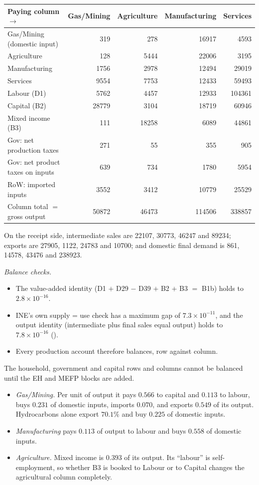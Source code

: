 \documentclass[../solutions_manual.tex]{subfiles}
\begin{document}
\begin{center}\small
\begin{tabular}{lrrrr}
\toprule
Paying column $\to$ & Gas/Mining & Agriculture & Manufacturing & Services \\
\midrule
Gas/Mining (domestic input) & 319 & 278 & 16917 & 4593 \\
Agriculture & 128 & 5444 & 22006 & 3195 \\
Manufacturing & 1756 & 2978 & 12494 & 29019 \\
Services & 9554 & 7753 & 12433 & 59493 \\
Labour (D1) & 5762 & 4457 & 12933 & 104361 \\
Capital (B2) & 28779 & 3104 & 18719 & 60946 \\
Mixed income (B3) & 111 & 18258 & 6089 & 44861 \\
Gov: net production taxes & 271 & 55 & 355 & 905 \\
Gov: net product taxes on inputs & 639 & 734 & 1780 & 5954 \\
RoW: imported inputs & 3552 & 3412 & 10779 & 25529 \\
\midrule
Column total $=$ gross output & 50872 & 46473 & 114506 & 338857 \\
\bottomrule
\end{tabular}
\end{center}
On the receipt side, intermediate sales are 22107, 30773, 46247 and 89234; exports are 27905, 1122, 24783 and 10700; and domestic final demand is 861, 14578, 43476 and 238923.

\emph{Balance checks.}
\begin{itemize}
\item The value-added identity (D1 $+$ D29 $-$ D39 $+$ B2 $+$ B3 $=$ B1b) holds to $2.8\times10^{-16}$.
\item INE's own supply = use check has a maximum gap of $7.3\times10^{-11}$, and the output identity (intermediate plus final sales equal output) holds to $7.8\times10^{-16}$ ().
\item Every production account therefore balances, row against column.
\end{itemize}
The household, government and capital rows and columns cannot be balanced until the EH and MEFP blocks are added.

\begin{itemize}
\item \emph{Gas/Mining.} Per unit of output it pays $0.566$ to capital and $0.113$ to labour, buys $0.231$ of domestic inputs, imports $0.070$, and exports $0.549$ of its output. Hydrocarbons alone export $70.1\%$ and buy $0.225$ of domestic inputs.
\item \emph{Manufacturing} pays $0.113$ of output to labour and buys $0.558$ of domestic inputs.
\item \emph{Agriculture.} Mixed income is $0.393$ of its output. Its ``labour'' is self-employment, so whether B3 is booked to Labour or to Capital changes the agricultural column completely.
\end{itemize}
\end{document}
